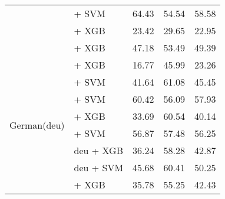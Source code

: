 \begin{longtable}{p{4cm}p{6cm}ccc}
                                          & \citep{zpoint-large-embedding-zh} + SVM                                & 64.43                                & 54.54              & 58.58             \\
                                          & \citep{all-MiniLM-L12-v2} + XGB                                        & 23.42                                & 29.65              & 22.95             \\
                                          & \citep{sturua2024jinaembeddingsv3multilingualembeddingstask} + XGB     & 47.18                                & 53.49              & 49.39             \\

    \midrule
    \multirow{11}{*}{German(deu)}         & \citep{all-MiniLM-L12-v2}  + XGB                                       & 16.77                                & 45.99              & 23.26             \\
                                          & \citep{heinz2023e5basestsende} + SVM                                   & 41.64                                & 61.08              & 45.45             \\
                                          & \citep{wang2024multilingual} + SVM                                     & 60.42                                & 56.09              & 57.93             \\
                                          & \citep{chan2020germanslanguagemodel} + XGB                             & 33.69                                & 60.54              & 40.14             \\
                                          & \citep{chibb2023germansemanticsts} + SVM                               & 56.87                                & 57.48              & 56.25             \\
                                          & \citep{mohr2024multi} deu + XGB                                        & 36.24                                & 58.28              & 42.87             \\
                                          & \citep{mohr2024multi} deu + SVM                                        & 45.68                                & 60.41              & 50.25             \\
                                          & \citep{sturua2024jinaembeddingsv3multilingualembeddingstask} + XGB     & 35.78                                & 55.25              & 42.43             \\

\end{longtable}
